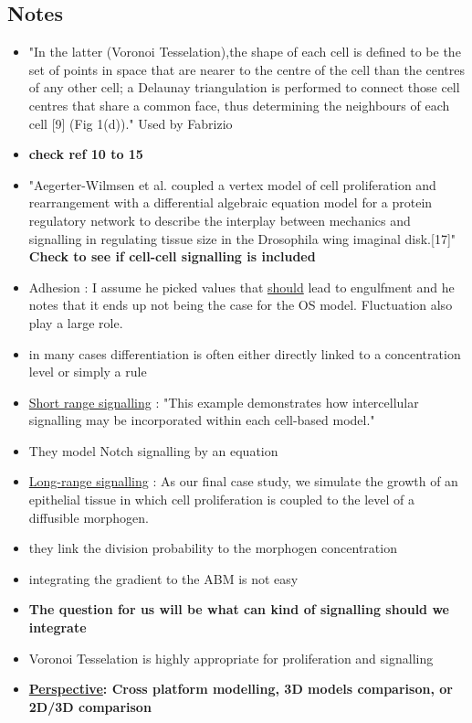 \documentclass[11pt,a4paper]{article}
\begin{document}
\subsection*{Notes}
\begin{itemize}
\item "In the latter (Voronoi Tesselation),the shape of each cell is defined to be the set of points in space that are nearer to the centre of the cell than the centres of any other cell; a Delaunay triangulation is performed to connect those cell centres that share a common face, thus determining the neighbours of each cell [9] (Fig 1(d))." Used by Fabrizio
\item \textbf{check ref 10 to 15}
\item  "Aegerter-Wilmsen et al. coupled a vertex model of cell proliferation and rearrangement with a differential algebraic equation model for a protein regulatory network to describe the interplay between mechanics and signalling in regulating tissue size in the Drosophila wing imaginal disk.[17]" \textbf{Check to  see if cell-cell signalling is included}
\item  Adhesion : I assume he picked values that \underline{should} lead to engulfment and he notes that it ends up not being the case for the OS model. Fluctuation also play a large role.
\item in many cases differentiation is often either directly linked to a concentration level or simply a rule
\item \underline{Short range signalling} : "This example demonstrates how intercellular signalling may be incorporated within each cell-based model."
\item They model Notch signalling by an equation
\item \underline{Long-range signalling} : As our final case study, we simulate the growth of an epithelial tissue in which cell proliferation is coupled to the level of a diffusible morphogen. 
\item they link the division probability to the morphogen concentration 
\item integrating the gradient to the ABM is not easy
\item \textbf{The question for us will be what can kind of signalling should we integrate}
\item Voronoi Tesselation is highly appropriate for proliferation and signalling
\item \textbf{\underline{Perspective}: Cross platform modelling, 3D models comparison, or 2D/3D comparison}
\end{itemize}
\end{document}
